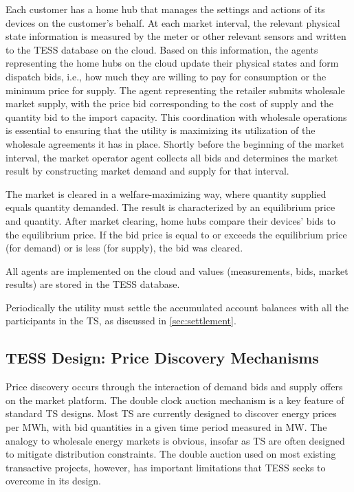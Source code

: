 Each customer has a home hub that manages the settings and actions of its devices on the customer's behalf. At each market interval, the relevant physical state information is measured by the meter or other relevant sensors and written to the TESS database on the cloud.
Based on this information, the agents representing the home hubs on the cloud update their physical states and form dispatch bids, i.e., how much they are willing to pay for consumption or the minimum price for supply. 
The agent representing the retailer submits wholesale market supply, with the price bid corresponding to the cost of supply and the quantity bid to the import capacity. This coordination with wholesale operations is essential to ensuring that the utility is maximizing its utilization of the wholesale agreements it has in place.
Shortly before the beginning of the market interval, the market operator agent collects all bids and determines the market result by constructing market demand and supply for that interval. 

The market is cleared in a welfare-maximizing way, where quantity supplied equals quantity demanded. The result is characterized by an equilibrium price and quantity.
After market clearing, home hubs compare their devices' bids to the equilibrium price. If the bid price is equal to or exceeds the equilibrium price (for demand) or is less (for supply), the bid was cleared. 

All agents are implemented on the cloud and values (measurements, bids, market results) are stored in the TESS database.

Periodically the utility must settle the accumulated account balances with all the participants in the TS, as discussed in \cref{sec:settlement}.

\subsection{TESS Design: Price Discovery Mechanisms}\label{sec:price_discovery}

Price discovery occurs through the interaction of demand bids and supply offers on the market platform. 
The double clock auction mechanism is a key feature of standard TS designs. Most TS are currently designed to discover energy prices per MWh, with bid quantities in a given time period measured in MW.  The analogy to wholesale energy markets is obvious, insofar as TS are often designed to mitigate distribution constraints.
The double auction used on most existing transactive projects, however, has important limitations that TESS seeks to overcome in its design. 

